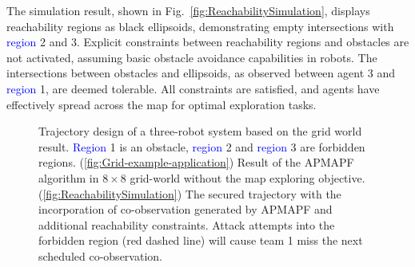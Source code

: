 \documentclass[10pt,twocolumn,twoside]{IEEEtran}
\newcommand{\new}[1]{\textcolor{blue}{#1}}
\begin{document}
The simulation result, shown in Fig.~\ref{fig:ReachabilitySimulation}, displays reachability regions as black ellipsoids, demonstrating empty intersections with \new{region} 2 and 3. Explicit constraints between reachability regions and obstacles are not activated, assuming basic obstacle avoidance capabilities in robots. The intersections between obstacles and ellipsoids, as observed between agent 3 and \new{region} 1, are deemed tolerable. All constraints are satisfied, and agents have effectively spread across the map for optimal exploration tasks.

\begin{figure}
  \centering
  \caption{ Trajectory design of a three-robot system based on the grid world result. \new{Region} 1 is an obstacle, \new{region} 2 and \new{region} 3 are forbidden regions. (\ref{fig:Grid-example-application}) Result of the APMAPF algorithm in $8\times8$ grid-world without the map exploring objective. (\ref{fig:ReachabilitySimulation}) The secured trajectory with the incorporation of co-observation generated by APMAPF and additional reachability constraints. Attack attempts into the forbidden region (red dashed line) will cause team 1 miss the next scheduled co-observation.}
  \label{fig:example-application}
\end{figure}
\end{document}
